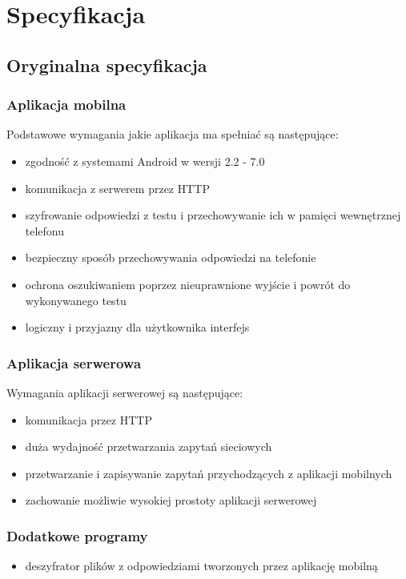 \documentclass[eng]{mgr}
\begin{document}
	\chapter{Specyfikacja}
	
		\section{Oryginalna specyfikacja}
		
			\subsection{Aplikacja mobilna}
			Podstawowe wymagania jakie aplikacja ma spełniać są następujące:
			\begin{itemize}
				\item zgodność z systemami Android w wersji 2.2 - 7.0
				\item komunikacja z serwerem przez HTTP
				\item szyfrowanie odpowiedzi z testu i przechowywanie ich w pamięci wewnętrznej telefonu
				\item bezpieczny sposób przechowywania odpowiedzi na telefonie
				\item ochrona oszukiwaniem poprzez nieuprawnione wyjście i powrót do wykonywanego testu
				\item logiczny i przyjazny dla użytkownika interfejs
			\end{itemize}
		
			\subsection{Aplikacja serwerowa}
			Wymagania aplikacji serwerowej są następujące:
			\begin{itemize}
				\item komunikacja przez HTTP
				\item duża wydajność przetwarzania zapytań sieciowych
				\item przetwarzanie i zapisywanie zapytań przychodzących z aplikacji mobilnych
				\item zachowanie możliwie wysokiej prostoty aplikacji serwerowej
			\end{itemize}
		
			\subsection{Dodatkowe programy}
			\begin{itemize}
				\item deszyfrator plików z odpowiedziami tworzonych przez aplikację mobilną
			\end{itemize}
		
\end{document}
